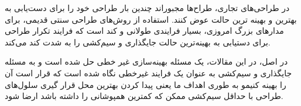 در طراحی‌های تجاری، طراح‌ها مجبور‌اند چندین بار طراحی خود را برای دست‌یابی به بهترین و بهینه ترین حالت عوض کنند. استفاده از روش‌های طراحی‌ سنتی قدیمی، برای مدار‌های بزرگ امروزی، بسیار فرایندی طولانی و کند است که فرایند تکرار طراحی برای دستیابی به بهینه‌ترین حالت جایگذاری و سیم‌کشی را به شدت کند می‌کند.





در اصل، در این مقالات، یک مسئله بهینه‌سازی غیر خطی حل شده است و به مسئله جایگذاری و سیم‌کشی به عنوان یک فرایند غیرخطی نگاه شده است که قرار است آن را بهینه کنیمو به طوری اهداف ما یعنی پیدا کردن بهترین محل قرار گیری سلول‌های طراحی با حداقل سیم‌کشی ممکن که کمترین همپوشانی را داشته باشد ارضا شود.



%
%
%
%
%
%
%
%
%
%
%
%
